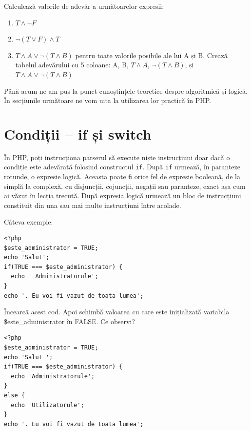 \begin{Exercise}[title={Operații logice},difficulty=1]
Calculează valorile de adevăr a următoarelor expresii:
\begin{enumerate}
  \item $T \land {\lnot}F $
  \item $\lnot(T \lor F) \land T $
  \item $T \land A \lor \lnot(T \land B)$ pentru toate valorile posibile ale lui A și B. Crează tabelul adevărului cu 5 coloane: A, B, $T \land A$, $\lnot(T \land B)$, și $T \land A \lor \lnot(T \land B)$
\end{enumerate}
\end{Exercise}

Până acum ne-am pus la punct cunoștințele teoretice despre algoritmică și logică. În secțiunile următoare
ne vom uita la utilizarea lor practică în PHP.



\label{endsec:tipul de date boolean. Expresii logice}

\section{Condiții -- if și switch}
În PHP, poți instrucționa parserul să execute niște instrucțiuni doar dacă
o condiție este adevărată folosind constructul \texttt{if}. După \texttt{if}
urmează, în paranteze rotunde, o expresie logică. Aceasta poate fi orice fel
de expresie booleană, de la simplă la complexă, cu disjuncții, cojuncții, negații sau
paranteze, exact așa cum ai văzut în lecția trecută. După expresia logică urmează un bloc
de instrucțiuni constituit din una sau mai multe instrucțiuni între acolade.

Câteva exemple:
\begin{lstlisting}
<?php
$este_administrator = TRUE;
echo 'Salut';
if(TRUE === $este_administrator) {
  echo ' Administratorule';
}
echo '. Eu voi fi vazut de toata lumea';
\end{lstlisting}
Încearcă acest cod. Apoi schimbă valoarea cu care este inițializată
variabila \$este\_administrator în FALSE. Ce observi?

\begin{lstlisting}[caption={Utilitatea verificărilor}, label=lst:check_utilisation]
<?php
$este_administrator = TRUE;
echo 'Salut ';
if(TRUE === $este_administrator) {
  echo 'Administratorule';
}
else {
  echo 'Utilizatorule';
}
echo '. Eu voi fi vazut de toata lumea';
\end{lstlisting}

